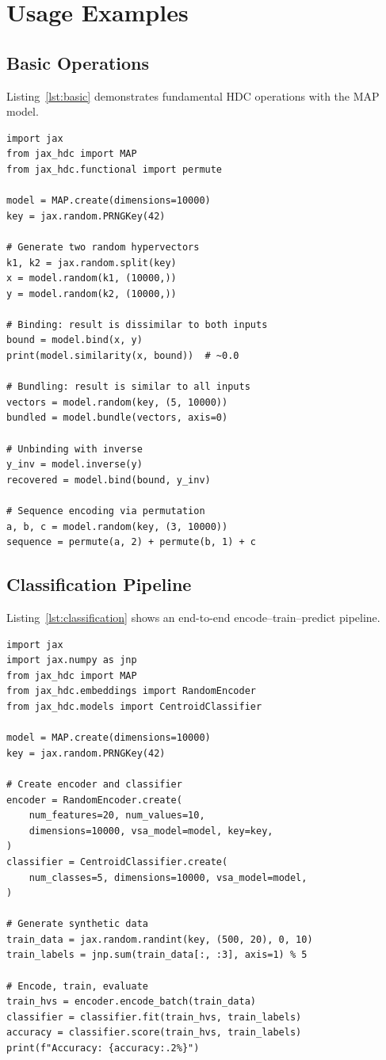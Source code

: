 \documentclass[twoside,11pt]{article}
\begin{document}
\section{Usage Examples}
\label{sec:examples}

\subsection{Basic Operations}

Listing~\ref{lst:basic} demonstrates fundamental HDC operations with the MAP model.

\begin{lstlisting}[caption={Basic HDC operations},label={lst:basic}]
import jax
from jax_hdc import MAP
from jax_hdc.functional import permute

model = MAP.create(dimensions=10000)
key = jax.random.PRNGKey(42)

# Generate two random hypervectors
k1, k2 = jax.random.split(key)
x = model.random(k1, (10000,))
y = model.random(k2, (10000,))

# Binding: result is dissimilar to both inputs
bound = model.bind(x, y)
print(model.similarity(x, bound))  # ~0.0

# Bundling: result is similar to all inputs
vectors = model.random(key, (5, 10000))
bundled = model.bundle(vectors, axis=0)

# Unbinding with inverse
y_inv = model.inverse(y)
recovered = model.bind(bound, y_inv)

# Sequence encoding via permutation
a, b, c = model.random(key, (3, 10000))
sequence = permute(a, 2) + permute(b, 1) + c
\end{lstlisting}

\subsection{Classification Pipeline}

Listing~\ref{lst:classification} shows an end-to-end encode--train--predict pipeline.

\begin{lstlisting}[caption={Classification with RandomEncoder and CentroidClassifier},label={lst:classification}]
import jax
import jax.numpy as jnp
from jax_hdc import MAP
from jax_hdc.embeddings import RandomEncoder
from jax_hdc.models import CentroidClassifier

model = MAP.create(dimensions=10000)
key = jax.random.PRNGKey(42)

# Create encoder and classifier
encoder = RandomEncoder.create(
    num_features=20, num_values=10,
    dimensions=10000, vsa_model=model, key=key,
)
classifier = CentroidClassifier.create(
    num_classes=5, dimensions=10000, vsa_model=model,
)

# Generate synthetic data
train_data = jax.random.randint(key, (500, 20), 0, 10)
train_labels = jnp.sum(train_data[:, :3], axis=1) % 5

# Encode, train, evaluate
train_hvs = encoder.encode_batch(train_data)
classifier = classifier.fit(train_hvs, train_labels)
accuracy = classifier.score(train_hvs, train_labels)
print(f"Accuracy: {accuracy:.2%}")
\end{lstlisting}
\end{document}
